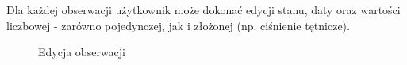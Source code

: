 \documentclass[a4paper]{article}
\begin{document}
Dla każdej obserwacji użytkownik może dokonać edycji stanu, daty oraz wartości liczbowej - zarówno pojedynczej, jak i złożonej (np. ciśnienie tętnicze).
\begin{figure}[H]
    \caption{Edycja obserwacji}
\end{figure}

\pagebreak
\end{document}
